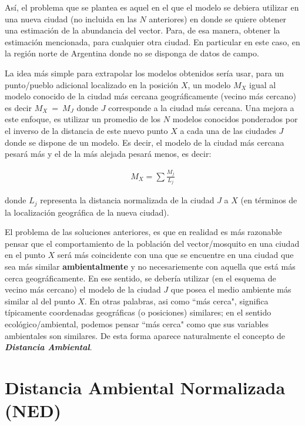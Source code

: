   \par Así, el problema que se plantea es aquel en el que el modelo se
    debiera utilizar en una nueva ciudad (no incluida en las $N$ anteriores) en
    donde se quiere obtener una estimación de la abundancia del vector.
    Para, de esa manera, obtener la estimación mencionada, para cualquier otra
    ciudad. En particular en este caso, en la región norte de Argentina donde
    no se disponga de datos de campo.


  \par La idea más simple para extrapolar los modelos obtenidos sería usar,
    para un punto/pueblo adicional localizado en la posición $X$, un modelo $M_{X}$
    igual al modelo conocido de la ciudad más cercana geográficamente (vecino más cercano) es
    decir $M_{X}\ =\ M_{J}$ donde $J$ corresponde a la ciudad más cercana.
    Una mejora a este enfoque, es utilizar un promedio de los $N$ modelos conocidos
    ponderados por el inverso de la distancia de este nuevo punto $X$ a cada una
    de las ciudades $J$ donde se dispone de un modelo. Es decir, el modelo de la
    ciudad más cercana pesará más y el de la más alejada pesará menos, es decir:

    \begin{align}
      M_{X} = \sum{}{\frac{M_{j}}{L_{j}}} \label{Eq:dist}
    \end{align}

    donde $L_{j}$ representa la distancia normalizada de la ciudad $J$ a
    $X$ (en términos de la localización geográfica de la nueva ciudad).


  \par El problema de las soluciones anteriores, es que en realidad es más
    razonable pensar que el comportamiento de la población del vector/mosquito
    en una ciudad en el punto $X$ será más coincidente con una que se encuentre
    en una ciudad que sea más similar \textbf{ambientalmente} y no necesariemente
    con aquella que está más cerca geográficamente. En ese sentido, se debería
    utilizar (en el esquema de vecino más cercano) el modelo de la ciudad $J$
    que posea el medio ambiente más similar al del punto $X$. En otras palabras,
    asi como ``más cerca", significa típicamente coordenadas geográficas (o posiciones)
    similares; en el sentido ecológico/ambiental, podemos pensar ``más cerca"
    como que sus variables ambientales son similares. De esta forma aparece
    naturalmente el concepto de \textbf{\textit{Distancia Ambiental}}.


\section{Distancia Ambiental Normalizada (NED)}

